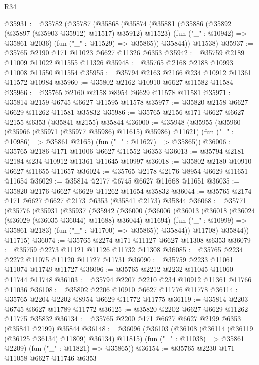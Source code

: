 \begin{lexlean}{R34}
\begin{coremodule}
@35931 := @35782
    (@35787
      (@35868
        (@35874
          (@35881
            (@35886 (@35892 (@35897 (@35903 @35912) @11517) @35912) @11523)
            (fun ("_" : @10942) => @35861 @2036)
            (fun ("_" : @11529) => @35865))
          @35844))
      @11538)
@35937 := @35765 @2190 @171 @11023 @6627 @11326 @6353
@35942 := @35759 @2189 @11009 @11022 @11555 @11326
@35948 := @35765 @2168 @2188 @10993 @11008 @11550 @11554
@35955 := @35794 @2163 @2166 @234 @10912 @11361 @11572 @10984
@35960 := @35802 @2162 @10910 @6627 @11582 @11584
@35966 := @35765 @2160 @2158 @8954 @6629 @11578 @11581
@35971 := @35814 @2159 @6745 @6627 @11595 @11578
@35977 := @35820 @2158 @6627 @6629 @11262 @11581 @35832
@35986 := @35765 @2156 @171 @6627 @6627 @2155 @6353 (@35841 @2155) @35844
@36000 := @35948
    (@35955
      (@35960 (@35966 (@35971 (@35977 @35986) @11615) @35986) @11621)
      (fun ("_" : @10986) => @35861 @2165)
      (fun ("_" : @11627) => @35865))
@36006 := @35765 @2186 @171 @11006 @6627 @11552 @6353
@36013 := @35794 @2181 @2184 @234 @10912 @11361 @11645 @10997
@36018 := @35802 @2180 @10910 @6627 @11655 @11657
@36024 := @35765 @2178 @2176 @8954 @6629 @11651 @11654
@36029 := @35814 @2177 @6745 @6627 @11668 @11651
@36035 := @35820 @2176 @6627 @6629 @11262 @11654 @35832
@36044 := @35765 @2174 @171 @6627 @6627 @2173 @6353 (@35841 @2173) @35844
@36068 := @35771
    (@35776
      (@35931
        (@35937
          (@35942
            (@36000
              (@36006
                (@36013
                  (@36018 (@36024 (@36029 (@36035 @36044) @11688) @36044) @11694)
                  (fun ("_" : @10999) => @35861 @2183)
                  (fun ("_" : @11700) => @35865))
                @35844))
            @11708)
          @35844))
      @11715)
@36074 := @35765 @2274 @171 @11127 @6627 @11308 @6353
@36079 := @35759 @2273 @11121 @11126 @11732 @11308
@36085 := @35765 @2234 @2272 @11075 @11120 @11727 @11731
@36090 := @35759 @2233 @11061 @11074 @11749 @11727
@36096 := @35765 @2212 @2232 @11045 @11060 @11744 @11748
@36103 := @35794 @2207 @2210 @234 @10912 @11361 @11766 @11036
@36108 := @35802 @2206 @10910 @6627 @11776 @11778
@36114 := @35765 @2204 @2202 @8954 @6629 @11772 @11775
@36119 := @35814 @2203 @6745 @6627 @11789 @11772
@36125 := @35820 @2202 @6627 @6629 @11262 @11775 @35832
@36134 := @35765 @2200 @171 @6627 @6627 @2199 @6353 (@35841 @2199) @35844
@36148 := @36096
    (@36103
      (@36108 (@36114 (@36119 (@36125 @36134) @11809) @36134) @11815)
      (fun ("_" : @11038) => @35861 @2209)
      (fun ("_" : @11821) => @35865))
@36154 := @35765 @2230 @171 @11058 @6627 @11746 @6353

\end{coremodule}
\end{lexlean}
